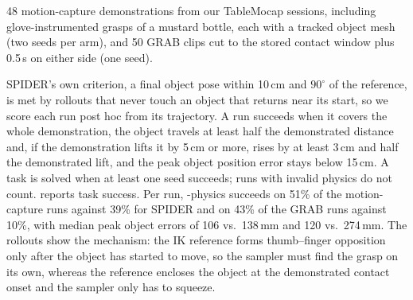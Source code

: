  48 motion-capture demonstrations from our TableMocap sessions, including glove-instrumented grasps of a mustard bottle, each with a tracked object mesh (two seeds per arm), and 50 GRAB clips cut to the stored contact window plus 0.5\,s on either side (one seed).

 SPIDER's own criterion, a final object pose within 10\,cm and $90^\circ$ of the reference, is met by rollouts that never touch an object that returns near its start, so we score each run post hoc from its trajectory. A run succeeds when it covers the whole demonstration, the object travels at least half the demonstrated distance and, if the demonstration lifts it by 5\,cm or more, rises by at least 3\,cm and half the demonstrated lift, and the peak object position error stays below 15\,cm. A task is solved when at least one seed succeeds; runs with invalid physics do not count.  reports task success. Per run, \ours-physics succeeds on 51\% of the motion-capture runs against 39\% for SPIDER and on 43\% of the GRAB runs against 10\%, with median peak object errors of 106 vs.\ 138\,mm and 120 vs.\ 274\,mm. The rollouts show the mechanism: the IK reference forms thumb--finger opposition only after the object has started to move, so the sampler must find the grasp on its own, whereas the \ours reference encloses the object at the demonstrated contact onset and the sampler only has to squeeze.
